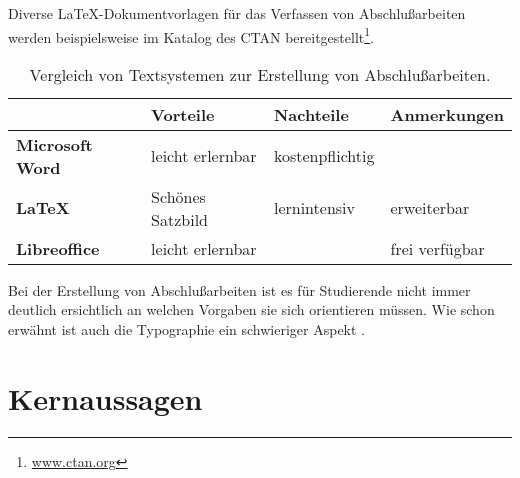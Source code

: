 \documentclass[12pt,        %
  english,ngerman,          %
  paper=a4,                 %
  captions=tablesignature,  %
  listof=numbered,          %
  bibliography=totoc,       %
  headings=small,           %
  headinclude=false,        %
  footinclude=false,        %
  parskip=half-,            %
  oneside,                  %
  DIV=12                    %
  ]{scrbook}                %
\begin{document}
Diverse \LaTeX-Dokumentvorlagen für das Verfassen von Abschlußarbeiten werden
beispielsweise im Katalog des CTAN
bereitgestellt\footnote{\href{https://www.ctan.org/}{www.ctan.org}}.

\begin{table}[ht]
  \renewcommand{\tabcolsep}{3mm}
  \renewcommand{\arraystretch}{1.5}
  \begin{center}
    \begin{tabular}{llll}
                              & \textbf{Vorteile}  & \textbf{Nachteile} & \textbf{Anmerkungen}\\
      \hline
      \textbf{Microsoft Word} & leicht erlernbar   & kostenpflichtig    & \\
      \textbf{\LaTeX}         & Schönes Satzbild   & lernintensiv       & erweiterbar \\
      \textbf{Libreoffice}    & leicht erlernbar   &                    & frei verfügbar \\
    \end{tabular}
    \caption{Vergleich von Textsystemen zur Erstellung von Abschlußarbeiten.}
    \label{table:typesetting}
  \end{center}
\end{table}%

Bei der Erstellung von Abschlußarbeiten ist es für Studierende nicht immer deutlich ersichtlich
an welchen Vorgaben sie sich orientieren müssen. Wie schon \citet[Seite 19]{bringhurst-2005-elements_typographic_style} erwähnt ist auch die Typographie ein schwieriger Aspekt \citep{willberg-2008-wegweiser_schrift}.


\section{Kernaussagen}\label{sec:main_points}

\end{document}
